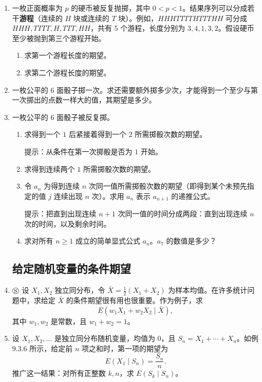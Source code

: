 \documentclass[UTF8,12pt,a4paper,fontset=fandol]{ctexart}
\begin{document}
\begin{enumerate}
  \item 一枚正面概率为 $p$ 的硬币被反复抛掷，其中 $0<p<1$。结果序列可以分成若干\textbf{游程}（连续的 $H$ 块或连续的 $T$ 块）。例如，$HHHTTTTHTTTHH$ 可分成 $HHH,TTTT,H,TTT,HH$，共有 5 个游程，长度分别为 $3,4,1,3,2$。假设硬币至少被抛到第三个游程开始。
  \begin{enumerate}
    \item[(a)] 求第一个游程长度的期望。
    \item[(b)] 求第二个游程长度的期望。
  \end{enumerate}

  \item 一枚公平的 6 面骰子掷一次。求还需要额外掷多少次，才能得到一个至少与第一次掷出的点数一样大的值，其期望是多少。

  \item 一枚公平的 6 面骰子被反复掷。
  \begin{enumerate}
    \item[(a)] 求得到一个 $1$ 后紧接着得到一个 $2$ 所需掷骰次数的期望。

    \noindent 提示：从条件在第一次掷骰是否为 $1$ 开始。

    \item[(b)] 求得到连续两个 $1$ 所需掷骰次数的期望。
    \item[(c)] 令 $a_n$ 为得到连续 $n$ 次同一值所需掷骰次数的期望（即得到某个未预先指定的值 $j$ 连续出现 $n$ 次）。求用 $a_n$ 表示 $a_{n+1}$ 的递推公式。

    \noindent 提示：把直到出现连续 $n+1$ 次同一值的时间分成两段：直到出现连续 $n$ 次的时间，以及剩余时间。

    \item[(d)] 求对所有 $n\ge1$ 成立的简单显式公式 $a_n$。$a_7$ 的数值是多少？
  \end{enumerate}

\subsection*{给定随机变量的条件期望}

  \item $\circledS$ 设 $X_1,X_2$ 独立同分布，令 $\bar X=\frac12(X_1+X_2)$ 为样本均值。在许多统计问题中，求给定 $\bar X$ 的条件期望很有用也很重要。作为例子，求
  \[
    E(w_1X_1+w_2X_2\mid \bar X),
  \]
  其中 $w_1,w_2$ 是常数，且 $w_1+w_2=1$。

  \item 设 $X_1,X_2,\ldots$ 是独立同分布随机变量，均值为 $0$，且 $S_n=X_1+\cdots+X_n$。如例 9.3.6 所示，给定前 $n$ 项之和时，第一项的期望为
  \[
    E(X_1\mid S_n)=\frac{S_n}{n}.
  \]
  推广这一结果：对所有正整数 $k,n$，求 $E(S_k\mid S_n)$。


\end{enumerate}
\end{document}
